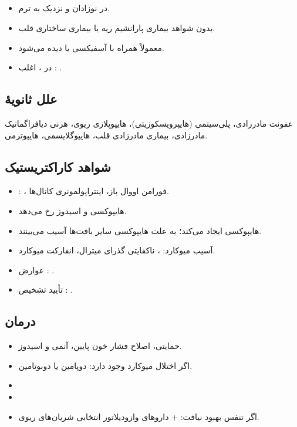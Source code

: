 \documentclass[12pt,a4paper]{article}
\begin{document}
\subsection*{}
\begin{itemize}
\item در نوزادان  و نزدیک به ترم.
\item {} بدون شواهد بیماری پارانشیم ریه یا بیماری ساختاری قلب.
\item {} معمولاً همراه با آسفیکسی یا  دیده می‌شود.
\item در ، اغلب : .
\end{itemize}
\subsection*{علل ثانویهٔ }
عفونت مادرزادی، پلی‌سیتمی (هایپرویسکوزیتی)، هایپوپلازی ریوی، هرنی دیافراگماتیک مادرزادی، بیماری  مادرزادی قلب، هایپوگلایسمی، هایپوترمی.
\subsection*{شواهد کاراکتریستیک }
\begin{itemize}
\item {}: ، فورامن اووال باز، اینتراپولمونری کانال‌ها.
\item هایپوکسی و اسیدوز رخ می‌دهد.
\end{itemize}

\begin{itemize}
\item {} هایپوکسی ایجاد می‌کند؛ به علت هایپوکسی سایر بافت‌ها آسیب می‌بینند.
\item آسیب میوکارد: ، ناکفایتی گذرای میترال، انفارکت میوکارد.
\item عوارض : .
\item تأیید تشخیص : .
\end{itemize}
\subsection*{درمان}
\begin{itemize}
\item حمایتی، اصلاح فشار خون پایین، آنمی و اسیدوز.
\item اگر اختلال میوکارد وجود دارد: دوپامین یا دوبوتامین.
\item {}
\item {}
\item اگر تنفس بهبود نیافت:  + داروهای وازودیلاتور انتخابی شریان‌های ریوی.
\end{itemize}
\end{document}
